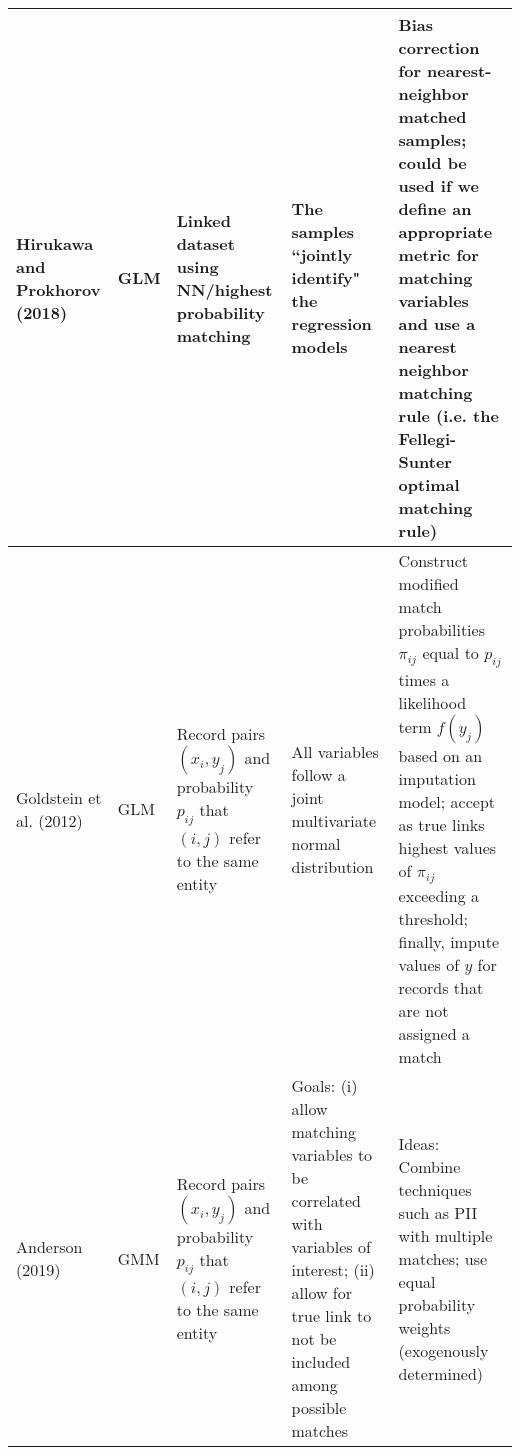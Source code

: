 \documentclass[border=10pt]{standalone}
\begin{document}
\begin{tabular}{L{3.5cm}C{3cm}L{4cm}L{8cm}L{12cm}}
\midrule 
Hirukawa and Prokhorov (2018) & GLM & Linked dataset using NN/highest probability matching & The samples ``jointly identify" the regression models & Bias correction for nearest-neighbor matched samples; could be used if we define an appropriate metric for matching variables and use a nearest neighbor matching rule (i.e. the Fellegi-Sunter optimal matching rule)\\
\midrule
Goldstein et al. (2012) & GLM & Record pairs $(x_i, y_j)$ and probability $p_{ij}$ that $(i,j)$ refer to the same entity  & All variables follow a joint multivariate normal distribution & Construct modified match probabilities $\pi_{ij}$ equal to $p_{ij}$ times a likelihood term $f(y_j)$ based on an imputation model; accept as true links highest values of $\pi_{ij}$ exceeding a threshold; finally, impute values of $y$ for records that are not assigned a match \\

\midrule
Anderson (2019) & GMM & Record pairs $(x_i, y_j)$ and probability $p_{ij}$ that $(i,j)$ refer to the same entity & Goals: (i) allow matching variables to be correlated with variables of interest; (ii) allow for true link to not be included among possible matches & Ideas: Combine techniques such as PII with multiple matches; use equal probability weights (exogenously determined)  
 \end{tabular}
 
\end{document}
